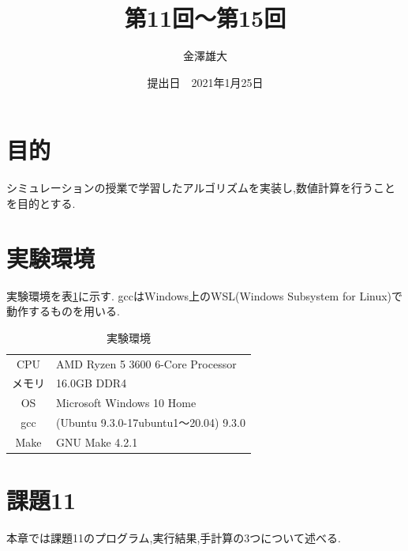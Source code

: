 \documentclass[a4j]{jarticle}
\title{第11回～第15回}
\date{提出日　2021年1月25日}
\author{金澤雄大}
\begin{document}
    \maketitle
    \thispagestyle{empty}
    \clearpage
    \addtocounter{page}{-1}
    \section{目的}
    シミュレーションの授業で学習したアルゴリズムを実装し,数値計算を行うことを目的とする.

    \section{実験環境}
      実験環境を表\ref{env}に示す. gccはWindows上のWSL(Windows Subsystem for Linux)で動作するものを用いる.
      \begin{table}[H]
        \caption{実験環境}
      \label{env}
      \begin{center}
          \begin{tabular}{c|l}\hline
            CPU & AMD Ryzen 5 3600 6-Core Processor \\ 
            メモリ & 16.0GB DDR4 \\
            OS & Microsoft Windows 10 Home \\
            gcc & (Ubuntu 9.3.0-17ubuntu1～20.04) 9.3.0 \\
            Make & GNU Make 4.2.1 \\ \hline
          \end{tabular}
      \end{center}
      \end{table}

      \section{課題11}
      本章では課題11のプログラム,実行結果,手計算の3つについて述べる.
\end{document}
